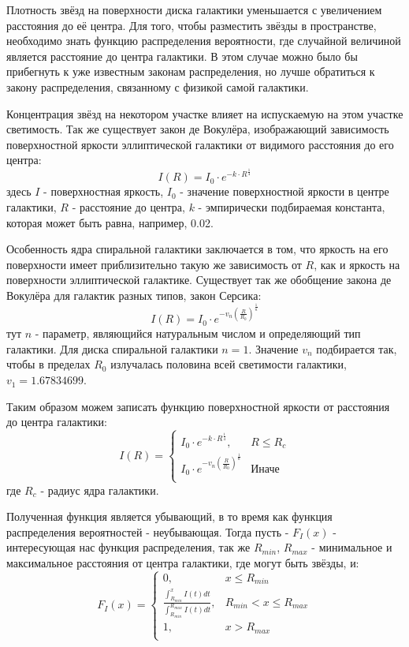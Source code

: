 Плотность звёзд на поверхности диска галактики уменьшается с увеличением расстояния до её центра. Для того, чтобы разместить звёзды в пространстве, необходимо знать функцию распределения вероятности, где случайной величиной является расстояние до центра галактики. В этом случае можно было бы прибегнуть к уже известным законам распределения, но лучше обратиться к закону распределения, связанному с физикой самой галактики.

Концентрация звёзд на некотором участке влияет на испускаемую на этом участке светимость. Так же существует закон де Вокулёра, изображающий зависимость поверхностной яркости эллиптической галактики от видимого расстояния до его центра:
\begin{equation}
	I(R) = I_0 \cdot{} e^{-k\cdot{}R^\frac{1}{4}}
\end{equation}
здесь $I$ - поверхностная яркость, $I_0$ - значение поверхностной яркости в центре галактики, $R$ - расстояние до центра, $k$ - эмпирически подбираемая константа, которая может быть равна, например, 0.02.

Особенность ядра спиральной галактики заключается в том, что яркость на его поверхности имеет приблизительно такую же зависимость от $R$, как и яркость на поверхности эллиптической галактике. Существует так же обобщение закона де Вокулёра для галактик разных типов, закон Серсика:
\begin{equation}
	I(R) = I_0 \cdot{} e^{-v_n(\frac{R}{R_0})^\frac{1}{n}}
\end{equation}
тут $n$ - параметр, являющийся натуральным числом и определяющий тип галактики. Для диска спиральной галактики $n = 1$. Значение $v_n$ подбирается так, чтобы в пределах $R_0$ излучалась половина всей светимости галактики, $v_1 = 1.67834699$.

Таким образом можем записать функцию поверхностной яркости от расстояния до центра галактики:
\begin{equation}
    I(R) = \left\{ \begin{array}{ll}
		I_0 \cdot{} e^{-k\cdot{}R^\frac{1}{4}}, 		& \textrm{$R \leq{} R_c$}\\
		I_0 \cdot{} e^{-v_n(\frac{R}{R_0})^\frac{1}{n}} & \textrm{Иначе}\\
	               \end{array} \right.
\end{equation}
где $R_c$ - радиус ядра галактики.

Полученная функция является убывающий, в то время как функция распределения вероятностей - неубывающая. Тогда пусть - $F_I(x)$ - интересующая нас функция распределения, так же $R_{min}$, $R_{max}$ - минимальное и максимальное расстояния от центра галактики, где могут быть звёзды, и:
\begin{equation} \label{eq:F_I}
	F_I(x) = \left\{ \begin{array}{ll}
		0, & \textrm{$x \leq{} R_{min}$}\\
		\frac{\int_{R_{min}}^x I(t)dt}{\int_{R_{min}}^{R_{max}} I(t)dt}, & \textrm{$R_{min} < x \leq{} R_{max}$}\\
		1, & \textrm{$x > R_{max}$}\\
			 \end{array} \right.
\end{equation}

